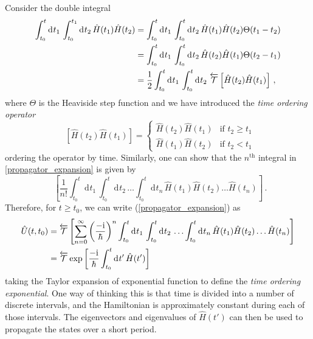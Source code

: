 \documentclass{article}
\theoremstyle{plain}\theoremheaderfont{\normalfont\itshape}\theorembodyfont{\rmfamily}\theoremseparator{.}\newtheorem*{rem}{Remark}\newtheorem*{ex}{Example}\newtheorem*{proof}{Proof}\newtheorem*{altp}{Alternative proof}
\theoremstyle{plain}\theoremheaderfont{\normalfont\bfseries}\theorembodyfont{\rmfamily}\theoremseparator{.}\newtheorem{thm}{Theorem}[section]\newtheorem{lem}[thm]{Lemma}\newtheorem{prop}[thm]{Proposition}\newtheorem*{cor}{Corollary}\newtheorem{defn}[thm]{Definition}\newtheorem{clm}[thm]{Claim}\newtheorem{clminproof}{Claim}
\theoremstyle{break}\theoremheaderfont{\normalfont\itshape}\theorembodyfont{\rmfamily}\theoremseparator{.\medskip}\newtheorem*{proofskip}{Proof}\newtheorem*{exs}{Examples}\newtheorem*{rems}{Remarks}
\theoremstyle{break}\theoremheaderfont{\normalfont\bfseries}\theorembodyfont{\rmfamily}\theoremseparator{.\medskip}\newtheorem{lemskip}[thm]{Lemma}\newtheorem{defnskip}[thm]{Definition}\newtheorem{propskip}[thm]{Proposition}\newtheorem{thmskip}[thm]{Theorem}
\numberwithin{equation}{section}
\newcommand{\ii}{\mathrm{i}}
\newcommand{\dd}[2][]{\mathrm{d}^{#1} #2\,}
\DeclareMathOperator{\tord}{\overleftarrow{\mathcal{T}}}
\begin{document}
    Consider the double integral
    \begin{align}
        \int_{t_0}^{t}\dd{t_1}\int_{t_0}^{t_1}\dd{t_2}\hat{H}(t_1)\hat{H}(t_2)&=\int_{t_0}^{t}\dd{t_1}\int_{t_0}^{t}\dd{t_2}\hat{H}(t_1)\hat{H}(t_2)\Theta(t_1-t_2)\notag\\
        &=\int_{t_0}^{t}\dd{t_1}\int_{t_0}^{t}\dd{t_2}\hat{H}(t_2)\hat{H}(t_1)\Theta(t_2-t_1)\notag\\
        &=\frac{1}{2}\int_{t_0}^{t}\dd{t_1}\int_{t_0}^{t}\dd{t_2}\tord\left[\hat{H}(t_2)\hat{H}(t_1)\right]\,,
    \end{align}
    where \(\Theta\) is the Heaviside step function and we have introduced the \textit{time ordering operator}
    \begin{equation}
        \tord\left[\hat{H}(t_2)\hat{H}(t_1)\right]=\begin{cases}
            \hat{H}(t_2)\hat{H}(t_1) & \text{if }t_2\ge t_1\\
            \hat{H}(t_1)\hat{H}(t_2) & \text{if }t_2<t_1
        \end{cases}
    \end{equation}
    ordering the operator by time. Similarly, one can show that the \(n^{\text{th}}\) integral in \ref{propagator_expansion} is given by
    \begin{equation}
        \tord\left[\frac{1}{n!}\int_{t_0}^{t}\dd{t_1}\int_{t_0}^{t}\dd{t_2}\dots\int_{t_0}^{t}\dd{t_n}\hat{H}(t_1)\hat{H}(t_2)\dots\hat{H}(t_n)\right]\,.
    \end{equation}
    Therefore, for \(t\ge t_0\), we can write (\ref{propagator_expansion}) as
    \begin{align}
        \hat{U}(t,t_0)&=\tord\left[\sum_{n=0}^{\infty}\left(\frac{-\ii}{\hbar}\right)^n\int_{t_0}^{t}\dd{t_1}\int_{t_0}^{t}\dd{t_2}\dots\int_{t_0}^{t}\dd{t_n}\hat{H}(t_1)\hat{H}(t_2)\dots\hat{H}(t_n)\right]\notag \\
        &=\tord\exp\left[\frac{-\ii}{\hbar}\int_{t_0}^{t}\dd{t'}\hat{H}(t')\right]
    \end{align}
    taking the Taylor expansion of exponential function to define the \textit{time ordering exponential}. One way of thinking this is that time is divided into a number of discrete intervals, and the Hamiltonian is approximately constant during each of those intervals. The eigenvectors and eigenvalues of \(\hat{H}(t')\) can then be used to propagate the states over a short period.
\end{document}
